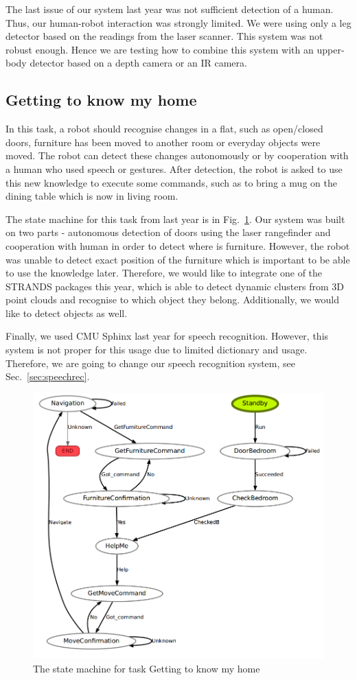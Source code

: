 The last issue of our system last year was not sufficient detection of a human. Thus, our human-robot interaction was strongly limited. 
We were using only a leg detector based on the readings from the laser scanner. 
This system was not robust enough. 
Hence we are testing how to combine this system with an upper-body detector based on a depth camera or an IR camera.

\subsection{Getting to know my home}

In this task, a robot should recognise changes in a flat, such as open/closed doors, furniture has been moved to another room or everyday objects were moved. 
The robot can detect these changes autonomously or by cooperation with a human who used speech or gestures.
After detection, the robot is asked to use this new knowledge to execute some commands, such as to bring a mug on the dining table which is now in living room.

The state machine for this task from last year is in Fig.~\ref{fig:st1}.
Our system was built on two parts - autonomous detection of doors using the laser rangefinder and cooperation with human in order to detect where is furniture. 
 However, the robot was unable to detect exact position of the furniture which is important to be able to use the knowledge later. 
Therefore, we would like to integrate one of the STRANDS packages this year, which is able to detect dynamic clusters from 3D point clouds and recognise to which object they belong. 
Additionally, we would like to detect objects as well.

Finally, we used CMU Sphinx last year for speech recognition. 
However, this system is not proper for this usage due to limited dictionary and usage. 
Therefore, we are going to change our speech recognition system, see Sec.~\ref{sec:speechrec}.

\begin{figure}[!htb]
\centering
\includegraphics[width=3.in]{statemachine_t1.png}
\caption{The state machine for task Getting to know my home}
\label{fig:st1}
\end{figure}

